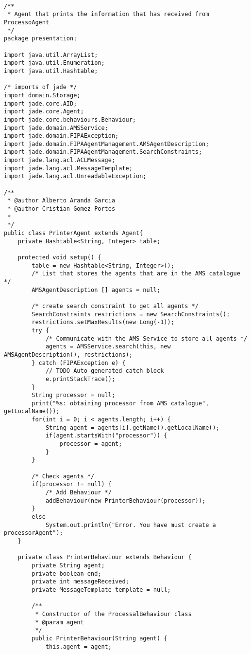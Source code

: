 \documentclass{pre-tfg}
\begin{document}
\begin{lstlisting}[caption=Código que pinta el número de anuncios encontrados en una página en forma de tabla,style=java]

/**
 * Agent that prints the information that has received from ProcessoAgent
 */
package presentation;

import java.util.ArrayList;
import java.util.Enumeration;
import java.util.Hashtable;

/* imports of jade */
import domain.Storage;
import jade.core.AID;
import jade.core.Agent;
import jade.core.behaviours.Behaviour;
import jade.domain.AMSService;
import jade.domain.FIPAException;
import jade.domain.FIPAAgentManagement.AMSAgentDescription;
import jade.domain.FIPAAgentManagement.SearchConstraints;
import jade.lang.acl.ACLMessage;
import jade.lang.acl.MessageTemplate;
import jade.lang.acl.UnreadableException;

/**
 * @author Alberto Aranda Garcia
 * @author Cristian Gomez Portes
 *
 */
public class PrinterAgent extends Agent{
	private Hashtable<String, Integer> table;
	
	protected void setup() {
		table = new Hashtable<String, Integer>();
		/* List that stores the agents that are in the AMS catalogue */
		AMSAgentDescription [] agents = null;
		
		/* create search constraint to get all agents */
		SearchConstraints restrictions = new SearchConstraints();
		restrictions.setMaxResults(new Long(-1));
		try {
			/* Communicate with the AMS Service to store all agents */
			agents = AMSService.search(this, new AMSAgentDescription(), restrictions);
		} catch (FIPAException e) {
			// TODO Auto-generated catch block
			e.printStackTrace();
		}
		String processor = null;
		print("%s: obtaining processor from AMS catalogue", getLocalName());
		for(int i = 0; i < agents.length; i++) {
			String agent = agents[i].getName().getLocalName();
			if(agent.startsWith("processor")) {
				processor = agent;
			}
		}
		
		/* Check agents */
		if(processor != null) {
			/* Add Behaviour */
			addBehaviour(new PrinterBehaviour(processor));
		}
		else
			System.out.println("Error. You have must create a processorAgent");
	}
	
	private class PrinterBehaviour extends Behaviour {
		private String agent;
		private boolean end;
		private int messageReceived;
		private MessageTemplate template = null;
		
		/**
		 * Constructor of the ProcessalBehaviour class
		 * @param agent
		 */
		public PrinterBehaviour(String agent) {
			this.agent = agent;
			

\end{lstlisting}
\end{document}
